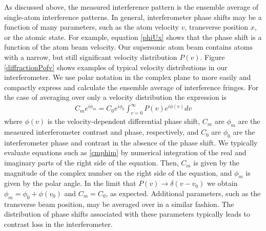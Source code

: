 As discussed above, the measured interference pattern is the ensemble average of single-atom interference patterns. In general, interferometer phase shifts may be a function of many parameters, such as the atom velocity $v$, transverse position $x$, or the atomic state. For example, equation \ref{phiUx} shows that the phase shift is a function of the atom beam velocity. Our supersonic atom beam contains atoms with a narrow, but still significant velocity distribution $P(v)$. Figure \ref{diffractionPofv} shows examples of typical velocity distributions in our interferometer. We use polar notation in the complex plane to more easily and compactly express and calculate the ensemble average of interference fringes. For the case of averaging over only a velocity distribution the expression is
\begin{eqnarray}
\label{cmphim}
C_m e^{i\phi_m}=C_0 e^{i\phi_0} \int_{v=0}^\infty P(v)e^{i\phi(v)}dv
\end{eqnarray}
where $\phi(v)$ is the velocity-dependent differential phase shift, $C_m$ are $\phi_m$ are the measured interferometer contrast and phase, respectively, and $C_0$ are $\phi_0$ are the interferometer phase and contrast in the absence of the phase shift. We typically evaluate equations such as \ref{cmphim} by numerical integration of the real and imaginary parts of the right side of the equation. Then, $C_m$ is given by the magnitude of the complex number on the right side of the equation, and $\phi_m$ is given by the polar angle. In the limit that $P(v)\rightarrow\delta(v-v_0)$ we obtain $\phi_m=\phi_0+\phi(v_0)$ and $C_m=C_0$, as expected. Additional parameters, such as the transverse beam position, may be averaged over in a similar fashion. The distribution of phase shifts associated with these parameters typically leads to contrast loss in the interferometer. 


